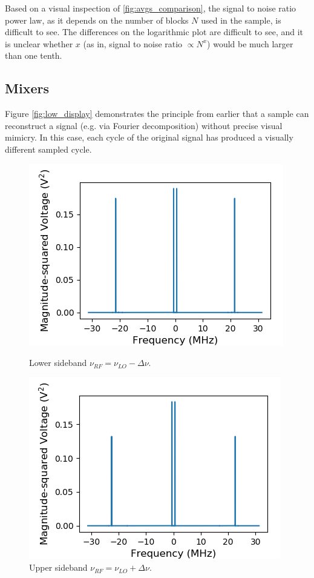 \documentclass[a4paper]{article}
\begin{document}
Based on a visual inspection of \ref{fig:avgs_comparison}, the signal to noise ratio power law, as it depends on the number of blocks $N$ used in the sample, is difficult to see. The differences on the logarithmic plot are difficult to see, and it is unclear whether $x$ (as in, signal to noise ratio $\propto N^x$) would be much larger than one tenth. 

\subsection{Mixers}


Figure \ref{fig:low_display} demonstrates the principle from earlier that a sample can reconstruct a signal (e.g. via Fourier decomposition) without precise visual mimicry. In this case, each cycle of the original signal has produced a visually different sampled cycle. 

\begin{figure}
\centering
\begin{minipage}{.5\textwidth}
	\centering
	\includegraphics[width=.8\linewidth]{7-1/l_power}
	\caption{Lower sideband $\nu_{RF} = \nu_{LO} - \Delta \nu$.}
	\label{fig:low_pow}
\end{minipage}%
\begin{minipage}{.5\textwidth}
	\centering
	\includegraphics[width=.8\linewidth]{7-1/h_power}
	\caption{Upper sideband $\nu_{RF} = \nu_{LO} + \Delta \nu$.}
	\label{fig:high_pow}
\end{minipage}
\end{figure}
\end{document}
